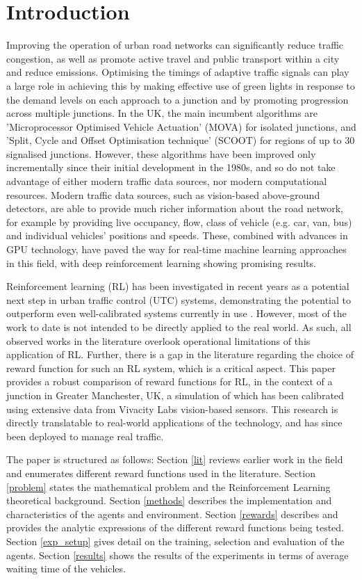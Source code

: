 \documentclass[conference]{IEEEtran}
\begin{document}
\section{Introduction}
Improving the operation of urban road networks can significantly reduce traffic congestion, as well as promote active travel and public transport within a city and reduce emissions.
Optimising the timings of adaptive traffic signals can play a large role in achieving this by making effective use of green lights in response to the demand levels on each approach to a junction and by promoting progression across multiple junctions.
In the UK, the main incumbent algorithms are 'Microprocessor Optimised Vehicle Actuation' (MOVA) \cite{MOVA} for isolated junctions, and 'Split, Cycle and Offset Optimisation technique' (SCOOT) \cite{SCOOT} for regions of  up to 30 signalised junctions.
However, these algorithms have been improved only incrementally since their initial development in the 1980s, and so do not take advantage of either modern traffic data sources, nor modern computational resources. Modern traffic data sources, such as vision-based above-ground detectors, are able to provide much richer information about the road network, for example by providing live occupancy, flow, class of vehicle (e.g. car, van, bus) and individual vehicles' positions and speeds.
These, combined with advances in GPU technology, have paved the way for real-time machine learning approaches in this field, with deep reinforcement learning showing promising results. 

Reinforcement learning (RL) has been investigated in recent years as a potential next step in urban traffic control (UTC) systems, demonstrating the potential to outperform even well-calibrated systems currently in use \cite{wei2019a}.
However, most of the work to date is not intended to be directly applied to the real world. As such, all observed works in the literature overlook operational limitations of this application of RL.
Further, there is a gap in the literature regarding the choice of reward function for such an RL system, which is a critical aspect.
This paper provides a robust comparison of reward functions for RL, in the context of a junction in Greater Manchester, UK, a simulation of which has been calibrated using extensive data from Vivacity Labs vision-based sensors.
This research is directly translatable to real-world applications of the technology, and has since been deployed to manage real traffic. 

The paper is structured as follows: Section \ref{lit} reviews earlier work in the field and enumerates different reward functions used in the literature.
Section \ref{problem} states the mathematical problem and the Reinforcement Learning theoretical background.
Section \ref{methods} describes the implementation and characteristics of the agents and environment.
Section \ref{rewards} describes and provides the analytic expressions of the different reward functions being tested.
Section \ref{exp_setup} gives detail on the training, selection and evaluation of the agents.
Section \ref{results} shows the results of the experiments in terms of average waiting time of the vehicles.
\end{document}
